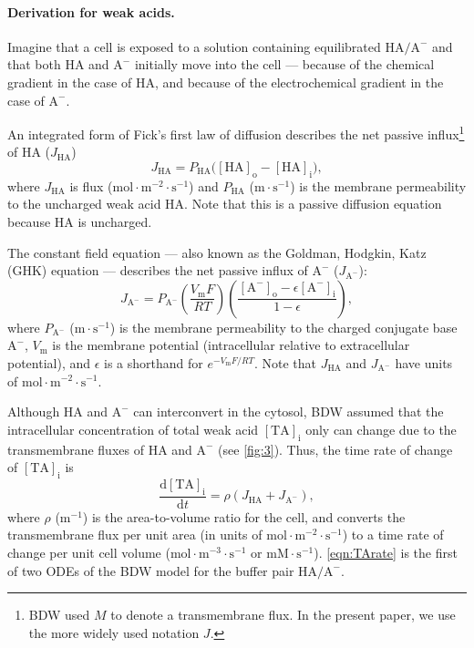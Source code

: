 \documentclass[fleqn,10pt]{physiome}
\begin{document}
\paragraph{Derivation for weak acids.}

Imagine that a cell is exposed to a solution containing equilibrated $\mathrm{HA}/\mathrm{A^-}$ and that both $\mathrm{HA}$ and $\mathrm{A^-}$ initially move into the cell --- because of the chemical gradient in the case of $\mathrm{HA}$, and because of the electrochemical gradient in the case of $\mathrm{A^-}$.

An integrated form of Fick's first law of diffusion describes the net passive influx\footnote{BDW used $M$ to denote a transmembrane flux. In the present paper, we use the more widely used notation $J$.} of $\mathrm{HA}$ ($J_\mathrm{HA}$)
\begin{equation}
J_\mathrm{HA}=P_\mathrm{HA}\bigg(\mathrm{[HA]_o}-\mathrm{[HA]_i}\bigg),
\label{eqn:J_HA}
\end{equation}
where $J_\mathrm{HA}$ is flux ($\mathrm{mol\cdot m^{-2}\cdot s^{-1}}$) and $P_\mathrm{HA}$ ($\mathrm{m\cdot s^{-1}}$) is the membrane permeability to the uncharged weak acid $\mathrm{HA}$. Note that this is a passive diffusion equation because $\mathrm{HA}$ is uncharged.

The constant field equation --- also known as the Goldman, Hodgkin, Katz (GHK) \citep{goldman1943potential,hodgkin1952quantitative} equation --- describes the net passive influx of $\mathrm{A^-}$ ($J_\mathrm{A^-}$):
\begin{equation}
J_\mathrm{A^-}=P_\mathrm{A^-}\left(\dfrac{V_\mathrm{m}F}{RT}\right)\left(\dfrac{\mathrm{[A^-]_o}-\epsilon\mathrm{[A^-]_i}}{1-\epsilon}\right),
\label{eqn:J_A}
\end{equation}
where $P_\mathrm{A^-}$ ($\mathrm{m\cdot s^{-1}}$) is the membrane permeability to the charged conjugate base $\mathrm{A^-}$, $V_\mathrm{m}$ is the membrane potential (intracellular relative to extracellular potential), and $\epsilon$ is a shorthand for $e^{{-V_\mathrm{m}F}/{RT}}$. Note that $J_\mathrm{HA}$ and $J_\mathrm{A^-}$ have units of $\mathrm{mol\cdot m^{-2}\cdot s^{-1}}$.

Although $\mathrm{HA}$ and $\mathrm{A^-}$ can interconvert in the cytosol, BDW assumed that the intracellular concentration of total weak acid $\mathrm{[TA]_i}$ only can change due to the transmembrane fluxes of $\mathrm{HA}$ and $\mathrm{A^-}$ (see \autoref{fig:3}). Thus, the time rate of change of $\mathrm{[TA]_i}$ is
\begin{equation}
\dfrac{\mathrm{d[TA]_i}}{\mathrm{d}t}=\rho\left(J_\mathrm{HA}+J_\mathrm{A^-}\right),
\label{eqn:TArate}
\end{equation}
where $\rho$ ($\mathrm{m^{-1}}$) is the area-to-volume ratio for the cell, and converts the transmembrane flux per unit area (in units of $\mathrm{mol\cdot m^{-2}\cdot s^{-1}}$) to a time rate of change per unit cell volume ($\mathrm{mol\cdot m^{-3}\cdot s^{-1}}$ or $\mathrm{mM\cdot s^{-1}}$). \autoref{eqn:TArate} is the first of two ODEs of the BDW model for the buffer pair $\mathrm{HA}/\mathrm{A^-}$.
\end{document}
